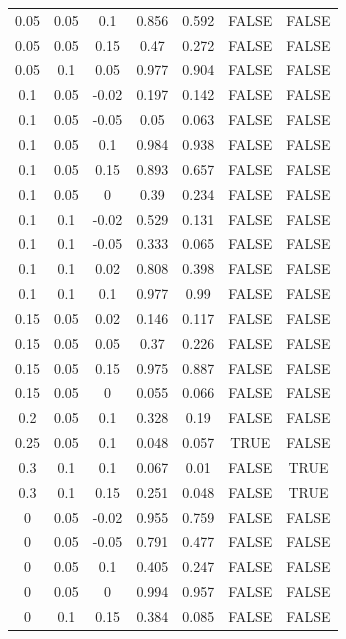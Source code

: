 \documentclass[
10pt, %
a4paper, %
oneside, %
headinclude,footinclude, %
BCOR5mm, %
]{scrartcl}
\begin{document}
\begin{table}[H]
\begin{tabular}{|c|c|c|c|c|c|c|}
		0.05  & 0.05  & 0.1   & 0.856      & 0.592     & FALSE      & FALSE     \\
		0.05  & 0.05  & 0.15  & 0.47       & 0.272     & FALSE      & FALSE     \\
		0.05  & 0.1   & 0.05  & 0.977      & 0.904     & FALSE      & FALSE     \\
		0.1   & 0.05  & -0.02 & 0.197      & 0.142     & FALSE      & FALSE     \\
		0.1   & 0.05  & -0.05 & 0.05       & 0.063     & FALSE      & FALSE     \\
		0.1   & 0.05  & 0.1   & 0.984      & 0.938     & FALSE      & FALSE     \\
		0.1   & 0.05  & 0.15  & 0.893      & 0.657     & FALSE      & FALSE     \\
		0.1   & 0.05  & 0     & 0.39       & 0.234     & FALSE      & FALSE     \\
		0.1   & 0.1   & -0.02 & 0.529      & 0.131     & FALSE      & FALSE     \\
		0.1   & 0.1   & -0.05 & 0.333      & 0.065     & FALSE      & FALSE     \\
		0.1   & 0.1   & 0.02  & 0.808      & 0.398     & FALSE      & FALSE     \\
		0.1   & 0.1   & 0.1   & 0.977      & 0.99      & FALSE      & FALSE     \\
		0.15  & 0.05  & 0.02  & 0.146      & 0.117     & FALSE      & FALSE     \\
		0.15  & 0.05  & 0.05  & 0.37       & 0.226     & FALSE      & FALSE     \\
		0.15  & 0.05  & 0.15  & 0.975      & 0.887     & FALSE      & FALSE     \\
		0.15  & 0.05  & 0     & 0.055      & 0.066     & FALSE      & FALSE     \\
		0.2   & 0.05  & 0.1   & 0.328      & 0.19      & FALSE      & FALSE     \\
		0.25  & 0.05  & 0.1   & 0.048      & 0.057     & TRUE       & FALSE     \\
		0.3   & 0.1   & 0.1   & 0.067      & 0.01      & FALSE      & TRUE      \\
		0.3   & 0.1   & 0.15  & 0.251      & 0.048     & FALSE      & TRUE      \\
		0     & 0.05  & -0.02 & 0.955      & 0.759     & FALSE      & FALSE     \\
		0     & 0.05  & -0.05 & 0.791      & 0.477     & FALSE      & FALSE     \\
		0     & 0.05  & 0.1   & 0.405      & 0.247     & FALSE      & FALSE     \\
		0     & 0.05  & 0     & 0.994      & 0.957     & FALSE      & FALSE     \\
		0     & 0.1   & 0.15  & 0.384      & 0.085     & FALSE      & FALSE  \\
		\hline  
	\end{tabular}
\end{table}
\end{document}
